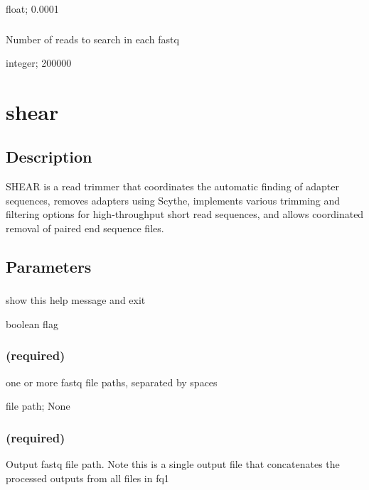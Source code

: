 \documentclass[letterpaper,10pt,english]{sphinxmanual}
\begin{document}
 float;  0.0001


\subsubsection{}
\label{\detokenize{prog_desc:n-number-of-reads}}
 Number of reads to search in each fastq

 integer;  200000


\section{shear}
\label{\detokenize{prog_desc:shear}}

\subsection{Description}
\label{\detokenize{prog_desc:id1}}
SHEAR is a read trimmer that coordinates the automatic
finding of adapter sequences, removes adapters using Scythe,
implements various trimming and filtering options
for high-throughput short read sequences, and allows coordinated
removal of paired end sequence files.


\subsection{Parameters}
\label{\detokenize{prog_desc:id2}}

\subsubsection{}
\label{\detokenize{prog_desc:id3}}
 show this help message and exit

 boolean flag


\subsubsection{ (required)}
\label{\detokenize{prog_desc:id4}}
 one or more fastq file paths, separated by spaces

 file path;  None


\subsubsection{ (required)}
\label{\detokenize{prog_desc:out1-required}}
 Output fastq file path. Note this is a single output file that concatenates the processed outputs from all files in \textendash{}fq1
\end{document}
